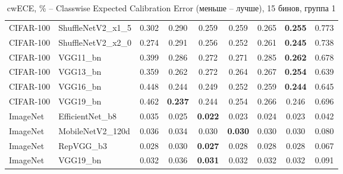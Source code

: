 \begin{table}[h!]
{\begin{tabular}{llccccccc}
CIFAR-100 & ShuffleNetV2\_x1\_5 &         0.302 &                  0.290 &                  0.259 &                  0.259 &                  0.265 & \textbf{0.255} &                  0.773 \\
CIFAR-100 & ShuffleNetV2\_x2\_0 &         0.274 &                  0.291 &                  0.256 &                  0.252 &                  0.261 & \textbf{0.245} &                  0.738 \\
CIFAR-100 &          VGG11\_bn &         0.399 &                  0.286 &                  0.272 &                  0.271 &                  0.285 & \textbf{0.262} &                  0.678 \\
CIFAR-100 &          VGG13\_bn &         0.359 &                  0.262 &                  0.272 &                  0.264 &                  0.267 & \textbf{0.254} &                  0.639 \\
CIFAR-100 &          VGG16\_bn &         0.448 &                  0.244 &                  0.249 &                  0.252 &                  0.259 & \textbf{0.244} &                  0.645 \\
CIFAR-100 &          VGG19\_bn &         0.462 & \textbf{0.237} &                  0.244 &                  0.254 &                  0.266 &                  0.246 &                  0.696 \\
 ImageNet &   EfficientNet\_b8 &         0.035 &                  0.025 & \textbf{0.022} &                  0.023 &                  0.024 &                  0.023 &                  0.042 \\
 ImageNet &  MobileNetV2\_120d &         0.036 &                  0.034 &                  0.030 & \textbf{0.030} &                  0.030 &                  0.030 &                  0.080 \\
 ImageNet &         RepVGG\_b3 &         0.028 &                  0.030 & \textbf{0.027} &                  0.028 &                  0.028 &                  0.028 &                  0.067 \\
 ImageNet &          VGG19\_bn &         0.032 &                  0.036 & \textbf{0.031} &                  0.032 &                  0.032 &                  0.032 &                  0.091 \\
\bottomrule
\end{tabular}%
}
\caption{cwECE, \% -- Classwise Expected Calibration Error (меньше -- лучше), 15 бинов, группа 1}
\label{tab:metrics:cwECE_1}
\end{table}
